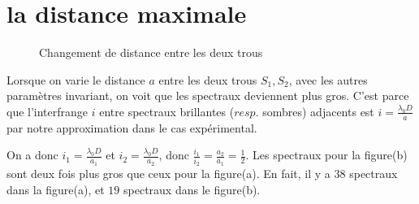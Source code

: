 \documentclass[a4paper,12pt]{book}
\begin{document}
\renewcommand{\labelitemi}{$\blacktriangleright$}
\renewcommand{\labelitemii}{$\bullet$}


\section{la distance maximale}
\begin{figure}[htbp]
    \centering
    \centering
    \caption{Changement de distance entre les deux trous}
    \end{figure}

Lorsque on varie le distance $a$ entre les deux trous $S_1, S_2$, avec les autres 
paramètres invariant, on voit que les spectraux deviennent plus gros. 
C'est parce que l'interfrange $i$ entre spectraux brillantes ($resp.$ sombres) adjacents 
est $i=\frac{\lambda_0D}{a}$ par notre approximation dans le cas expérimental.

On a donc $i_1=\frac{\lambda_0D}{a_1}$ et $i_2=\frac{\lambda_0D}{a_2}$, donc 
$\frac{i_1}{i_2}=\frac{a_2}{a_1}=\frac{1}{2}$. Les spectraux pour la figure(b) sont deux fois 
plus gros que ceux pour la figure(a). En fait, il y a $38$ spectraux dans la figure(a), et $19$ 
spectraux dans le figure(b). 
\end{document}
